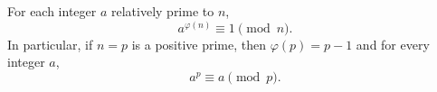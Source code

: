 For each integer $a$ relatively prime to $n$,
$$a^{\varphi(n)} \equiv 1 \pmod{n}.$$
In particular, if $n = p$ is a positive prime, then $\varphi(p) = p-1$ and for every integer $a$,
$$a^p \equiv a \pmod{p}.$$

